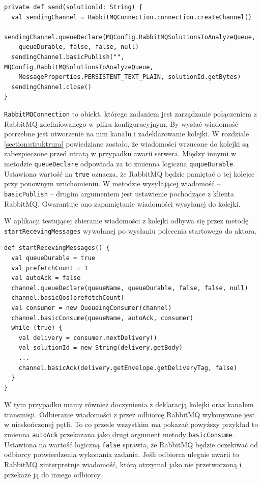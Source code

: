 \documentclass[brudnopis]{xmgr}
\begin{document}
\begin{verbatim}
private def send(solutionId: String) {
  val sendingChannel = RabbitMQConnection.connection.createChannel()
  sendingChannel.queueDeclare(MQConfig.RabbitMQSolutionsToAnalyzeQueue, 
    queueDurable, false, false, null)
  sendingChannel.basicPublish("", MQConfig.RabbitMQSolutionsToAnalyzeQueue, 
    MessageProperties.PERSISTENT_TEXT_PLAIN, solutionId.getBytes)
  sendingChannel.close()
}
\end{verbatim}

\texttt{RabbitMQConnection} to obiekt, którego zadaniem jest zarządzanie połączeniem z RabbitMQ zdefiniowanego w pliku konfiguracyjnym. By wysłać wiadomość potrzebne jest utworzenie na nim kanału i zadeklarowanie kolejki. W rozdziale \ref{section:struktrura} powiedziane zostało, że wiadomości wrzucone do kolejki są zabezpieczone przed utratą w przypadku awarii serwera. Między innymi w metodzie \texttt{queueDeclare} odpowiada za to zmienna logiczna \texttt{ququeDurable}. Ustawiona wartość na \texttt{true} oznacza, że RabbitMQ będzie pamiętać o tej kolejce przy ponownym uruchomieniu. W metodzie wysyłającej wiadomość -- \texttt{basicPublish} -- drugim argumentem jest ustawienie pochodzące z klienta RabbitMQ. Gwarantuje ono zapamiętanie wiadomości wysyłanej do kolejki.

W aplikacji testującej zbieranie wiadomości z kolejki odbywa się przez metodę \texttt{startRecevingMessages} wywołanej po wysłaniu polecenia startowego do aktora.

\begin{verbatim}
def startRecevingMessages() {
  val queueDurable = true
  val prefetchCount = 1
  val autoAck = false
  channel.queueDeclare(queueName, queueDurable, false, false, null)
  channel.basicQos(prefetchCount)
  val consumer = new QueueingConsumer(channel)
  channel.basicConsume(queueName, autoAck, consumer)
  while (true) {
    val delivery = consumer.nextDelivery()
    val solutionId = new String(delivery.getBody)
    ...
    channel.basicAck(delivery.getEnvelope.getDeliveryTag, false)
  }
}
\end{verbatim}

W tym przypadku mamy również doczynienia z deklaracją kolejki oraz kanałem transmisji. Odbieranie wiadomości z przez odbiorcę RabbitMQ wykonywane jest w nieskończonej pętli. To co przede wszystkim ma pokazać powyższy przykład to zmienna \texttt{autoAck} przekazana jako drugi argument metody \texttt{basicConsume}. Ustawiona na wartość logiczną \texttt{false} sprawia, że RabbitMQ będzie oczekiwać od odbiorcy potwierdzenia wykonania zadania. Jeśli odbiorca ulegnie awarii to RabbitMQ zinterpretuje wiadomość, którą otrzymał jako nie przetworzoną i przekaże ją do innego odbiorcy.
\end{document}
